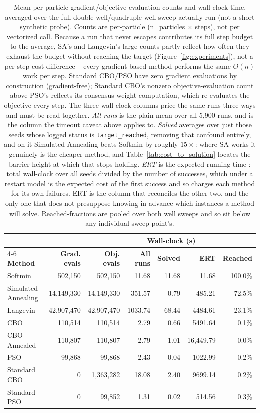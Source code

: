\documentclass{article}
\theoremstyle{plain}
\theoremstyle{definition}
\theoremstyle{remark}
\begin{document}
\begin{table}[H]
\centering
\caption{Mean per-particle gradient/objective evaluation counts and wall-clock time, averaged over the full double-well/quadruple-well sweep actually run (not a short synthetic probe). Counts are per-particle (n\_particles $\times$ steps), not per vectorized call. Because a run that never escapes contributes its full step budget to the average, SA's and Langevin's large counts partly reflect how often they exhaust the budget without reaching the target (Figure~\ref{fig:experiments}), not a per-step cost difference -- every gradient-based method performs the same $O(n)$ work per step. Standard CBO/PSO have zero gradient evaluations by construction (gradient-free); Standard CBO's nonzero objective-evaluation count above PSO's reflects its consensus-weight computation, which re-evaluates the objective every step. The three wall-clock columns price the same runs three ways and must be read together. \emph{All runs} is the plain mean over all 5{,}900 runs, and is the column the timeout caveat above applies to. \emph{Solved} averages over just those seeds whose logged status is \texttt{target\_reached}, removing that confound entirely, and on it Simulated Annealing beats Softmin by roughly $15\times$: where SA works it genuinely is the cheaper method, and Table~\ref{tab:cost_to_solution} locates the barrier height at which that stops holding. \emph{ERT} is the expected running time \cite{hansen2016coco}: total wall-clock over all seeds divided by the number of successes, which under a restart model is the expected cost of the first success and so charges each method for its own failures. ERT is the column that reconciles the other two, and the only one that does not presuppose knowing in advance which instances a method will solve. Reached-fractions are pooled over both well sweeps and so sit below any individual sweep point's.}
\label{tab:cost_comparison}
\small
\begin{tabular}{@{}lrrrrrr@{}}
\toprule
& & & \multicolumn{3}{c}{\textbf{Wall-clock (s)}} & \\
\cmidrule(lr){4-6}
\textbf{Method} & \textbf{Grad. evals} & \textbf{Obj. evals} & \textbf{All runs} & \textbf{Solved} & \textbf{ERT} & \textbf{Reached} \\
\midrule
Softmin & 502{,}150 & 502{,}150 & 11.68 & 11.68 & 11.68 & 100.0\% \\
Simulated Annealing & 14{,}149{,}330 & 14{,}149{,}330 & 351.57 & 0.79 & 485.21 & 72.5\% \\
Langevin & 42{,}907{,}470 & 42{,}907{,}470 & 1033.74 & 68.44 & 4484.61 & 23.1\% \\
CBO & 110{,}514 & 110{,}514 & 2.79 & 0.66 & 5491.64 & 0.1\% \\
CBO Annealed & 110{,}807 & 110{,}807 & 2.79 & 1.01 & 16{,}449.79 & 0.0\% \\
PSO & 99{,}868 & 99{,}868 & 2.43 & 0.04 & 1022.99 & 0.2\% \\
Standard CBO & 0 & 1{,}363{,}282 & 18.08 & 2.40 & 9699.14 & 0.2\% \\
Standard PSO & 0 & 99{,}852 & 1.31 & 0.02 & 514.56 & 0.3\% \\
\bottomrule
\end{tabular}
\end{table}
\end{document}
